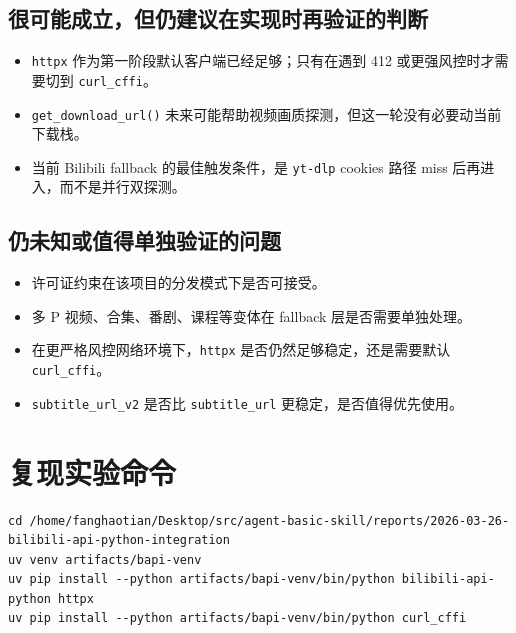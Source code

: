 \documentclass[a4paper]{article}
\begin{document}
\subsection{很可能成立，但仍建议在实现时再验证的判断}

\begin{itemize}
\item \texttt{httpx} 作为第一阶段默认客户端已经足够；只有在遇到 412 或更强风控时才需要切到 \texttt{curl\_cffi}。
\item \texttt{get\_download\_url()} 未来可能帮助视频画质探测，但这一轮没有必要动当前下载栈。
\item 当前 Bilibili fallback 的最佳触发条件，是 \texttt{yt-dlp} cookies 路径 miss 后再进入，而不是并行双探测。
\end{itemize}

\subsection{仍未知或值得单独验证的问题}

\begin{itemize}
\item 许可证约束在该项目的分发模式下是否可接受。
\item 多 P 视频、合集、番剧、课程等变体在 fallback 层是否需要单独处理。
\item 在更严格风控网络环境下，\texttt{httpx} 是否仍然足够稳定，还是需要默认 \texttt{curl\_cffi}。
\item \texttt{subtitle\_url\_v2} 是否比 \texttt{subtitle\_url} 更稳定，是否值得优先使用。
\end{itemize}

\appendix

\section{复现实验命令}

\begin{lstlisting}[caption={隔离环境中安装并验证 bilibili-api-python 的参考命令}]
cd /home/fanghaotian/Desktop/src/agent-basic-skill/reports/2026-03-26-bilibili-api-python-integration
uv venv artifacts/bapi-venv
uv pip install --python artifacts/bapi-venv/bin/python bilibili-api-python httpx
uv pip install --python artifacts/bapi-venv/bin/python curl_cffi
\end{lstlisting}
\end{document}
